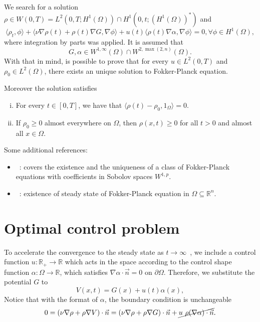 \documentclass[12pt]{article}
\newcommand{\R}{\mathbb{R}}
\newcommand{\n}{\vec{n}}
\newcommand{\inner}[2]{\langle{} #1, #2 \rangle{}}
\theoremstyle{definition}
\begin{document}
We search for a solution $\rho \in W(0,T) = L^2(0,T; H^1(\Omega)) \cap H^1(0, t; {(H^1(\Omega))}^*)$ and 
\[
\inner{\rho_t}{\phi} + \inner{\nu\nabla \rho(t) + \rho(t)\nabla G}{\nabla \phi} + u(t)\inner{\rho(t)\nabla \alpha}{\nabla \phi} = 0, \forall \phi \in H^1(\Omega),
\]
where integration by parts was applied.
It is assumed that 
\[
G, \alpha \in W^{1,\infty}(\Omega) \cap W^{2,\max(2,n)}(\Omega).
\]
With that in mind, is possible to prove that for every $u \in L^2(0,T)$ and $\rho_0 \in L^2(\Omega)$, there exists an unique solution to Fokker-Planck equation.

Moreover the solution satisfies
\begin{enumerate}[(i)]
    \item For every $t \in [0,T]$, we have that $\inner{\rho(t) - \rho_0}{1_{\Omega}} = 0$.
    \item If $\rho_0 \ge 0$ almost everywhere on $\Omega$, then $\rho(x,t) \ge 0$ for all $t > 0$ and almost all $x \in \Omega$.
\end{enumerate}

Some additional references:

\begin{itemize}
    \item~\cite{bris2008existence}: covers the existence and the uniqueness of a class of Fokker-Planck equations with coefficients in Sobolov spaces $W^{1,p}$.
    \item~\cite{huang2015steady}: existence of steady state of Fokker-Planck equation in $\Omega \subseteq \R^n$.
\end{itemize}

\section{Optimal control problem}

To accelerate the convergence to the steady state as $t \to \infty$~\cite{breiten2018control}, we include a control function $u : \R_{+} \to \R$ which acts in the space according to the control shape function $\alpha : \Omega \to \R$, which satisfies $\nabla \alpha \cdot \n = 0$ on $\partial \Omega$.
Therefore, we substitute the potential $G$ to
\[
V(x,t) = G(x) + u(t) \alpha(x),
\]
Notice that with the format of $\alpha$, the boundary condition is unchangeable
\[
0 = (\nu \nabla \rho + \rho \nabla V) \cdot \n = (\nu \nabla \rho + \rho \nabla G) \cdot \n + \cancel{u~\rho (\nabla \alpha) \cdot \n}.
\]
\end{document}
